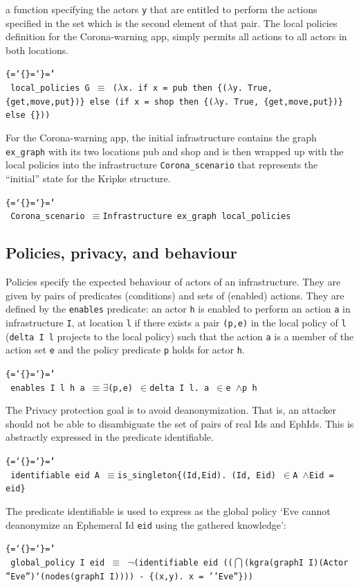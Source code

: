 \documentclass{llncs}
\newenvironment{ttbox}{\begin{alltt}\ttbraces\small\tt}%
                      {\end{alltt}}
\def\ttbraces{\let\.=\nobreak\chardef\{=`\{\chardef\}=`\}\chardef\|=`\\}
\newcommand\ttand{\mbox{{$\land$}}}
\newcommand\ttfun{\mbox{{$\Rightarrow$}}}
\newcommand\ttequiv{\mbox{{$\equiv$}}}
\newcommand\ttexists{\mbox{{$\exists$}}}
\newcommand\ttneg{\mbox{{$\neg$}}}
\newcommand\ttin{\mbox{{$\in$}}}
\newcommand\ttlam{\mbox{\( \lambda \)}}
\newcommand\tttimes{\mbox{\( \times \)}}
\newcommand\ttbigcap{\mbox{{$\bigcap$}}}
\begin{document}
a function specifying the actors \texttt{y} that are entitled to perform the actions 
specified in the set which is the second element of that pair.
The local policies definition for the Corona-warning app, simply permits all actions to
all actors in both locations.
\begin{ttbox}
  local_policies G \ttequiv
         (\ttlam x. if x = pub then  \{(\ttlam y. True, \{get,move,put\})\}
          else (if x = shop then \{(\ttlam y. True, \{get,move,put\})\} else \{\}))
\end{ttbox}  
For the Corona-warning app, the initial infrastructure contains the graph \texttt{ex\_graph}
with its two locations pub and shop and is then wrapped up with the local policies
into the infrastructure \texttt{Corona\_scenario} 
that represents the ``initial'' state for the Kripke structure.
\begin{ttbox}
 Corona_scenario \ttequiv Infrastructure  ex_graph local_policies
\end{ttbox}

\subsection{Policies, privacy, and behaviour}
\label{sec:}
Policies specify the expected behaviour of actors of an infrastructure. 
They are given by pairs of predicates (conditions) and sets of (enabled) actions.
They are defined by the \texttt{enables} predicate:
an actor \texttt{h} is enabled to perform an action \texttt{a} 
in infrastructure \texttt{I}, at location \texttt{l}
if there exists a pair \texttt{(p,e)} in the local policy of \texttt{l}
(\texttt{delta I l} projects to the local policy) such that the action 
\texttt{a} is a member of the action set \texttt{e} and the policy 
predicate \texttt{p} holds for actor \texttt{h}.
\begin{ttbox}
enables I l h a \ttequiv \ttexists (p,e) \ttin delta I l. a \ttin e \ttand p h
\end{ttbox} 

The Privacy protection goal is to avoid deanonymization. That is, an attacker should not be able to
disambiguate the set of pairs of real Ids and EphIds. This is abstractly expressed in the predicate
identifiable.
\begin{ttbox}
identifiable eid A \ttequiv is_singleton\{(Id,Eid). (Id, Eid) \ttin A \ttand Eid = eid\}
\end{ttbox}
The predicate identifiable is used to express as the global policy `Eve cannot deanonymize an Ephemeral
Id \texttt{eid} using the gathered knowledge':
\begin{ttbox}
  global_policy I eid \ttequiv
             \ttneg(identifiable eid 
                ((\ttbigcap (kgra(graphI I)(Actor ''Eve'')`(nodes(graphI I))))
                 - \{(x,y). x = ''Eve''\}))
\end{ttbox}
\end{document}
